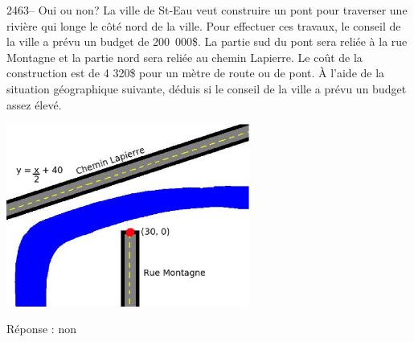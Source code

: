 \documentclass[letterpaper, 12pt]{article}
\begin{document}
2463-- Oui ou non? La ville de St-Eau veut construire un pont pour traverser une rivi\`ere qui longe le c\^ot\'e nord de la ville. Pour effectuer ces travaux, le conseil de la ville a pr\'evu un budget de \mbox{200 000\$}. La partie sud du pont sera reli\'ee \`a la rue Montagne et la partie nord sera reli\'ee au chemin Lapierre. Le co\^ut de la construction est de 4 320\$ pour un m\`etre de route ou de pont. \`A l'aide de la situation g\'eographique suivante, d\'eduis si le conseil de la ville a pr\'evu un budget assez \'elev\'e.\\
\begin{center}
 \includegraphics[width=8cm,bb=14 14 553 418]{Q2463.eps}
\end{center}

R\'eponse : non\\
\end{document}
